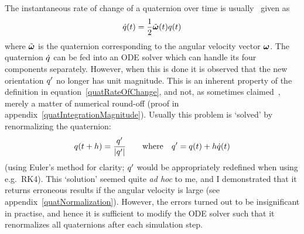 The instantaneous rate of change of a quaternion  over time is
usually~\cite{BaraffWitkin:97,Eberly:04,Saunders:PhD} given as
\begin{equation}
\label{quatRateOfChange}
\dot{\q{q}}(t) = \frac{1}{2}\tilde{\ve{\omega}}(t)\q{q}(t)
\end{equation}
where $\tilde{\ve{\omega}}$ is the quaternion corresponding to the angular velocity
vector $\ve{\omega}$. The quaternion $\dot{q}$ can be fed into an ODE solver which can handle
its four components separately. However, when this is done it is observed that the new orientation
$q'$ no longer has unit magnitude. This is an inherent property of the definition in
equation~\ref{quatRateOfChange}, and not, as sometimes claimed~\cite{Eberly:04}, merely a matter
of numerical round-off (proof in appendix~\ref{quatIntegrationMagnitude}). Usually this problem
is `solved' by renormalizing the quaternion:
\begin{equation}
q(t + h) = \frac{q'}{|q'|} \quad\quad\mathrm{where}\quad
    q' = q(t) + h\dot{q}(t)
\end{equation}
(using Euler's method for clarity; $q'$ would be appropriately redefined when using e.g.\ RK4).
This `solution' seemed quite \textsl{ad hoc} to me, and I demonstrated that it returns
erroneous results if the angular velocity is large (see appendix~\ref{quatNormalization}).
However, the errors turned out to be insignificant in practise, and hence it is sufficient to
modify the ODE solver such that it renormalizes all quaternions after each simulation step.
